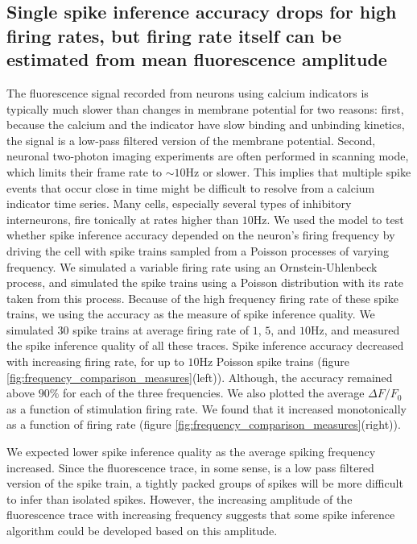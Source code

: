 \documentclass[a4paper,12pt]{article}
\theoremstyle{definition}
\begin{document}
\subsection{Single spike inference accuracy drops for high firing rates, but firing rate itself can be estimated from mean fluorescence amplitude}
The fluorescence signal recorded from neurons using calcium indicators is typically much slower than changes in membrane potential for two reasons: first, because the calcium and the indicator have slow binding and unbinding kinetics, the signal is a low-pass filtered version of the membrane potential. Second, neuronal two-photon imaging experiments are often performed in scanning mode, which limits their frame rate to $\sim 10$Hz or slower. This implies that multiple spike events that occur close in time might be difficult to resolve from a calcium indicator time series. Many cells, especially several types of inhibitory interneurons, fire tonically at rates higher than $10$Hz. We used the model to test whether spike inference accuracy depended on the neuron’s firing frequency by driving the cell with spike trains sampled from a Poisson processes of varying frequency. We simulated a variable firing rate using an Ornstein-Uhlenbeck process, and simulated the spike trains using a Poisson distribution with its rate taken from this process. Because of the high frequency firing rate of these spike trains, we using the accuracy as the measure of spike inference quality. We simulated $30$ spike trains at average firing rate of $1$, $5$, and $10$Hz, and measured the spike inference quality of all these traces. Spike inference accuracy decreased with increasing firing rate, for up to $10$Hz Poisson spike trains (figure \ref{fig:frequency_comparison_measures}(left)). Although, the accuracy remained above $90\%$ for each of the three frequencies. We also plotted the average $\Delta F/F_0$ as a function of stimulation firing rate. We found that it increased monotonically as a function of firing rate (figure \ref{fig:frequency_comparison_measures}(right)).

We expected lower spike inference quality as the average spiking frequency increased. Since the fluorescence trace, in some sense, is a low pass filtered version of the spike train, a tightly packed groups of spikes will be more difficult to infer than isolated spikes. However, the increasing amplitude of the fluorescence trace with increasing frequency suggests that some spike inference algorithm could be developed based on this amplitude.
\end{document}
